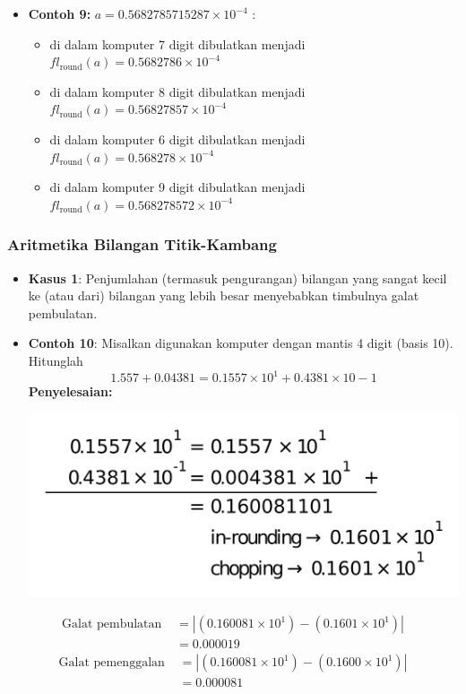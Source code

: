 \documentclass[pdflatex,compress]{beamer}
\begin{document}
\begin{frame}
	\begin{itemize}
		\item \textbf{Contoh 9:} $ a = 0.5682785715287 \times 10^{-4} $ :
		\begin{itemize}
			\item di dalam komputer 7 digit dibulatkan menjadi $ fl_{\text{round}}(a) =  0.5682786 \times 10^{-4} $
			\item di dalam komputer 8 digit dibulatkan menjadi $ fl_{\text{round}}(a) =  0.56827857 \times 10^{-4} $
			\item di dalam komputer 6 digit dibulatkan menjadi $ fl_{\text{round}}(a) =  0.568278 \times 10^{-4} $
			\item di dalam komputer 9 digit dibulatkan menjadi $ fl_{\text{round}}(a) =  0.568278572 \times 10^{-4} $
		\end{itemize}
	\end{itemize}
\end{frame}

\begin{frame}
	\frametitle{Aritmetika Bilangan Titik-Kambang}
	\begin{itemize}
		\item \textbf{Kasus 1}: Penjumlahan (termasuk pengurangan) bilangan yang sangat kecil ke (atau dari) bilangan yang lebih besar menyebabkan timbulnya galat pembulatan.
		\item \textbf{Contoh 10}: Misalkan digunakan komputer dengan mantis 4 digit (basis 10). Hitunglah
		\[ 1.557 + 0.04381 = 0.1557 \times 10^1 + 0.4381 \times 10-1 \]
		\textbf{Penyelesaian:}
		\begin{center}
			\includegraphics[width=0.6\linewidth]{img/img104.png}
		\end{center}
	\end{itemize}
\end{frame}

\begin{frame}
	\begin{align*}
		\text{Galat pembulatan }&= | (0.160081 \times 10^1) - (0.1601 \times 10^1)| \\ &= 0.000019
	\end{align*}
	\begin{align*}
		\text{Galat pemenggalan } &= | (0.160081 \times 10^1) - (0.1600 \times 10^1)| \\&= 0.000081
	\end{align*}
\end{frame}
\end{document}
